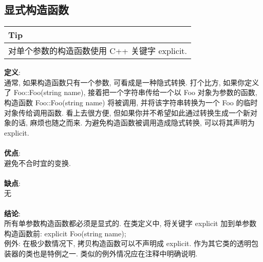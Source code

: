 \documentclass[a4paper,11pt,CJK]{article}
\begin{document}
\begin{CJK}{UTF8}{gbsn}
\subsection{显式构造函数}
\begin{table}[htbp]
\flushleft
\begin{tabular}{p{400pt}}
\toprule
\rowcolor[gray]{.8} Tip \\
\midrule
对单个参数的构造函数使用 C++ 关键字 explicit.\\
\bottomrule
\end{tabular}
\end{table}
\noindent
\textbf{定义}:\\
\indent 通常, 如果构造函数只有一个参数, 可看成是一种隐式转换. 打个比方, 如果你定义了 Foo::Foo(string name), 接着把一个字符串传给一个以 Foo 对象为参数的函数, 构造函数 Foo::Foo(string name) 将被调用, 并将该字符串转换为一个 Foo 的临时对象传给调用函数. 看上去很方便, 但如果你并不希望如此通过转换生成一个新对象的话, 麻烦也随之而来. 为避免构造函数被调用造成隐式转换, 可以将其声明为 explicit.\\
\\
\textbf{优点}:\\
\indent 避免不合时宜的变换.\\
\\
\textbf{缺点}:\\
\indent 无\\
\\
\textbf{结论}:\\
\indent 所有单参数构造函数都必须是显式的. 在类定义中, 将关键字 explicit 加到单参数构造函数前: explicit Foo(string name);\\
\indent 例外: 在极少数情况下, 拷贝构造函数可以不声明成 explicit. 作为其它类的透明包装器的类也是特例之一. 类似的例外情况应在注释中明确说明.


\end{CJK}
\end{document}

